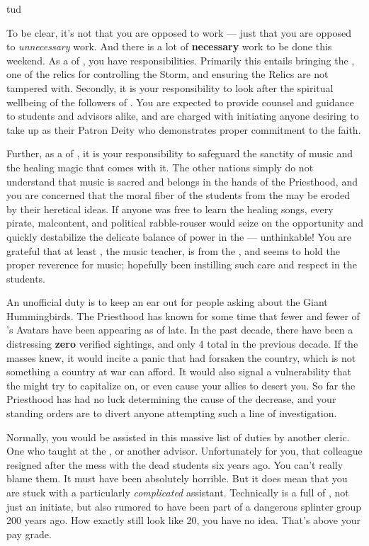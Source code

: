 tud\documentclass[char]{GL2020}
\begin{document}
To be clear, it's not that you are opposed to work — just that you are opposed to \emph{unnecessary} work. And there is a lot of \textbf{necessary} work to be done this weekend. As a \cHedonist{\cleric} of \cFarmGod{}, you have responsibilities. Primarily this entails bringing the \iPitcher{}, one of the \pFarm{} relics for controlling the Storm, and ensuring the Relics are not tampered with. Secondly, it is your responsibility to look after the spiritual wellbeing of the followers of \cFarmGod{}. You are expected to provide counsel and guidance to students and advisors alike, and are charged with initiating anyone desiring to take up \cFarmGod{} as their Patron Deity who demonstrates proper commitment to the faith. 

Further, as a \cHedonist{\cleric} of \cFarmGod{}, it is your responsibility to safeguard the sanctity of music and the healing magic that comes with it. The other nations simply do not understand that music is sacred and belongs in the hands of the Priesthood, and you are concerned that the moral fiber of the students from the \pFarm{} may be eroded by their heretical ideas. If anyone was free to learn the healing songs, every pirate, malcontent, and political rabble-rouser would seize on the opportunity and quickly destabilize the delicate balance of power in the \pFarm{} — unthinkable! You are grateful that at least \cMusic{\full}, the music teacher, is from the \pFarm{}, and seems to hold the proper reverence for music; hopefully \cMusic{\they} \cMusic{\have} been instilling such care and respect in the students.

An unofficial duty is to keep an ear out for people asking about the Giant Hummingbirds. The Priesthood has known for some time that fewer and fewer of \cFarmGod{}'s Avatars have been appearing as of late. In the past decade, there have been a distressing \textbf{zero} verified sightings, and only 4 total in the previous decade. If the masses knew, it would incite a panic that \cFarmGod{} had forsaken the country, which is not something a country at war can afford. It would also signal a vulnerability that the \pShippies{} might try to capitalize on, or even cause your \pTech{} allies to desert you. So far the Priesthood has had no luck determining the cause of the decrease, and your standing orders are to divert anyone attempting such a line of investigation.

Normally, you would be assisted in this massive list of duties by another cleric. One who taught at the \pSchool{}, or another advisor. Unfortunately for you, that colleague resigned after the mess with the dead students six years ago. You can’t really blame them. It must have been absolutely horrible. But it does mean that you are stuck with a particularly \emph{complicated} assistant. Technically \cDisney{} is a full \cDisney{\cleric} of \cFarmGod{}, not just an initiate, but \cDisney{\they} \cDisney{\are} also rumored to have been part of a dangerous splinter group 200 years ago. How exactly \cDisney{\they} still look\cDisney{\verbs} like \cDisney{\they} \cDisney{\are} 20, you have no idea. That’s above your pay grade.
\end{document}
